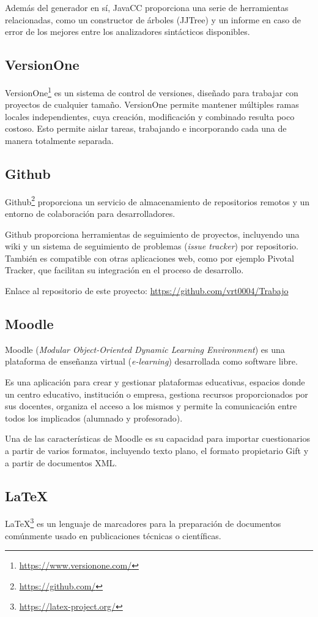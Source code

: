 Además del generador en sí, JavaCC proporciona una serie de herramientas relacionadas, como un constructor de árboles (JJTree) y un informe en caso de error de los mejores entre los analizadores sintácticos disponibles.
\subsection{VersionOne}
VersionOne\footnote{\url{https://www.versionone.com/}} es un sistema de control de versiones, diseñado para trabajar con proyectos de cualquier tamaño.
VersionOne permite mantener múltiples ramas locales independientes, cuya creación, modificación y combinado resulta poco costoso.
Esto permite aislar tareas, trabajando e incorporando cada una de manera totalmente separada.
\subsection{Github}
Github\footnote{\url{https://github.com/}} proporciona un servicio de almacenamiento de repositorios remotos y un entorno de colaboración para desarrolladores.

Github proporciona herramientas de seguimiento de proyectos, incluyendo una wiki y un sistema de seguimiento de problemas (\emph{issue tracker}) por repositorio.
También es compatible con otras aplicaciones web, como por ejemplo Pivotal Tracker, que facilitan su integración en el proceso de desarrollo.

Enlace al repositorio de este proyecto:  \url{https://github.com/vrt0004/Trabajo}
\subsection{Moodle }
Moodle (\emph{Modular Object-Oriented Dynamic Learning Environment}) es una plataforma de enseñanza virtual (\emph{e-learning}) desarrollada como software libre.

Es una aplicación para crear y gestionar plataformas educativas, espacios donde un centro educativo, institución o empresa, gestiona recursos proporcionados por sus docentes, organiza el acceso a los mismos y permite la comunicación entre todos los implicados (alumnado y profesorado).

Una de las características de Moodle es su capacidad para importar cuestionarios a partir de varios formatos, incluyendo texto plano, el formato propietario Gift y a partir de documentos XML.
\subsection{\LaTeX{}}
\LaTeX{}\footnote{\url{https://latex-project.org/}} es un lenguaje de marcadores para la preparación de documentos comúnmente usado en publicaciones técnicas o científicas.

